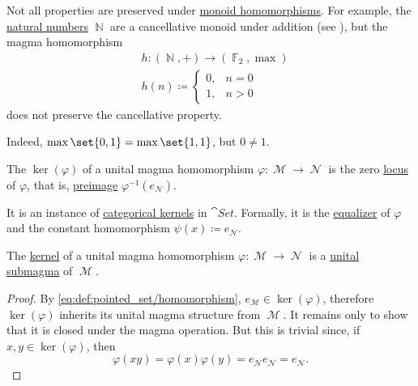\begin{example}\label{ex:monoid_cancellation_not_preserved_by_homomorphism}
  Not all properties are preserved under \hyperref[def:unital_magma/homomorphism]{monoid homomorphisms}. For example, the \hyperref[def:set_of_natural_numbers]{natural numbers} \( \BbbN \) are a cancellative monoid under addition (see ), but the magma homomorphism
  \begin{equation*}
    \begin{aligned}
      &h: (\BbbN, +) \to (\hyperref[thm:galois_field_existence]{\BbbF_2}, \max) \\
      &h(n) \coloneqq \begin{cases}
        0, &n = 0 \\
        1, &n > 0
      \end{cases}
    \end{aligned}
  \end{equation*}
  does not preserve the cancellative property.

  Indeed, \( \max\set{ 0, 1} = \max\set{ 1, 1 } \), but \( 0 \neq 1 \).
\end{example}

\begin{definition}\label{def:unital_magma_kernel}
  The  \( \ker(\varphi) \) of a unital magma homomorphism \( \varphi: \mscrM \to \mscrN \) is the zero \hyperref[def:zero_locus]{locus} of \( \varphi \), that is, \hyperref[thm:def:function/properties/preimage]{preimage} \( \varphi^{-1}(e_{\mscrN}) \).

  It is an instance of \hyperref[def:categorical_kernel]{categorical kernels} in \hyperref[def:category_of_small_sets]{\( \cat{Set} \)}. Formally, it is the \hyperref[thm:set_categorical_limits/equalizer]{equalizer} of \( \varphi \) and the constant homomorphism \( \psi(x) \coloneqq e_{\mscrN} \).
\end{definition}

\begin{proposition}\label{thm:unital_magma_kernel_is_submagma}
  The \hyperref[def:unital_magma_kernel]{kernel} of a unital magma homomorphism \( \varphi: \mscrM \to \mscrN \) is a \hyperref[def:first_order_substructure]{unital submagma} of \( \mscrM \).
\end{proposition}
\begin{proof}
  By \eqref{eq:def:pointed_set/homomorphism}, \( e_{\mscrM} \in \ker(\varphi) \), therefore \( \ker(\varphi) \) inherits its unital magma structure from \( \mscrM \). It remains only to show that it is closed under the magma operation. But this is trivial since, if \( x, y \in \ker(\varphi) \), then
  \begin{equation*}
    \varphi(xy) = \varphi(x) \varphi(y) = e_{\mscrN} e_{\mscrN} = e_{\mscrN}.
  \end{equation*}
\end{proof}

